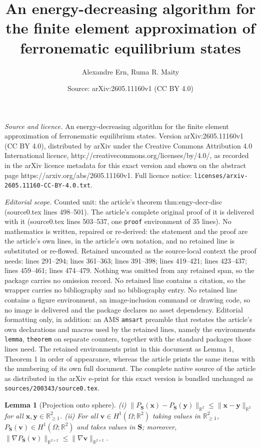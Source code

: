 \documentclass[10pt,a4paper]{amsart}
\title{An energy-decreasing algorithm for the finite element approximation of ferronematic equilibrium states}
\author{Alexandre Ern, Ruma R. Maity}
\date{Source: arXiv:2605.11160v1 (CC BY 4.0)}
\newtheorem{lemma}{Lemma}
\newcommand{\Real}{\mathbb{R}}
\newcommand{\bS}{{\boldsymbol S}}
\newcommand{\bv}{{\boldsymbol v}}
\newcommand{\bx}{{\boldsymbol x}}
\newcommand{\by}{{\boldsymbol y}}
\begin{document}
\maketitle

\noindent\emph{Source and licence.} An energy-decreasing algorithm for the finite element approximation of ferronematic equilibrium states. Version arXiv:2605.11160v1 (CC BY 4.0), distributed by arXiv under the Creative Commons Attribution 4.0 International licence, http://creativecommons.org/licenses/by/4.0/, as recorded in the arXiv licence metadata for this exact version and shown on the abstract page https://arxiv.org/abs/2605.11160v1. Full licence notice: \texttt{licenses/arxiv-2605.11160-CC-BY-4.0.txt}.\par\smallskip

\noindent\textit{Editorial scope.} Counted unit: the article's theorem thm:engy-decr-disc (source0.tex lines 498--501). The article's complete original proof of it is delivered with it (source0.tex lines 503--537, one \texttt{proof} environment of 35 lines). No mathematics is written, repaired or re-derived: the statement and the proof are the article's own lines, in the article's own notation, and no retained line is substituted or re-flowed.  Retained uncounted as the source-local context the proof needs: lines 291--294; lines 361--363; lines 391--398; lines 419--421; lines 423--437; lines 459--461; lines 474--479.  Nothing was omitted from any retained span, so the package carries no omission record.  No retained line contains a citation, so the wrapper carries no bibliography and no bibliography entry.  No retained line contains a figure environment, an image-inclusion command or drawing code, so no image is delivered and the package declares no asset dependency.  Editorial formatting only, in addition: an AMS \texttt{amsart} preamble that restates the article's own declarations and macros used by the retained lines, namely the environments \texttt{lemma}, \texttt{theorem} on separate counters, together with the standard packages those lines need.  The retained environments print in this document as Lemma 1, Theorem 1 in order of appearance, whereas the article prints the same items with the numbering of its own full document.  The complete native source of the article as distributed in the arXiv e-print for this exact version is bundled unchanged as \texttt{sources/200343/source0.tex}.
\begin{lemma}[Projection onto sphere] \label{lem:PS1}
\textup{(i)} $\|P_{\bS}(\bx)-P_{\bS}(\by)\|_{\Real^2} \le \|\bx-\by\|_{\Real^2}$ for all $\bx,\by \in \Real^2_{\ge1}$.
\textup{(ii)} For all $\bv \in H^1(\Omega;\Real^2)$ taking values in $\Real^2_{\ge1}$, $P_{\bS}(\bv) \in H^1(\Omega;\Real^2)$ and takes values in $\bS$; moreover, $\|\nabla P_{\bS}(\bv)\|_{\Real^{2\times2}} \le \|\nabla\bv\|_{\Real^{2\times2}}$. 
\end{lemma}
\end{document}
